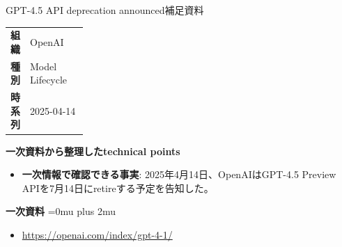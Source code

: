 \begin{technicalnote}{GPT-4.5 API deprecation announced}{補足資料}
\begingroup
\begin{tabularx}{\linewidth}{@{}>{\bfseries}p{0.22\linewidth}X@{}}
組織 & OpenAI \\
種別 & Model Lifecycle \\
時系列 & 2025-04-14 \\
\end{tabularx}
\smallskip
\begin{minipage}{\linewidth}
{\bfseries 一次資料から整理したtechnical points}
\begin{itemize}[leftmargin=1.5em,itemsep=0.35em]
\item \textbf{一次情報で確認できる事実}: 2025年4月14日、OpenAIはGPT-4.5 Preview APIを7月14日にretireする予定を告知した。
\end{itemize}
\begin{samepage}
{\bfseries 一次資料}
\begingroup\sloppy
\Urlmuskip=0mu plus 2mu\relax
\begin{itemize}[leftmargin=1.5em,itemsep=0.25em]
\item {\scriptsize\url{https://openai.com/index/gpt-4-1/}}
\end{itemize}
\endgroup
\end{samepage}
\end{minipage}
\endgroup
\end{technicalnote}
\medskip

